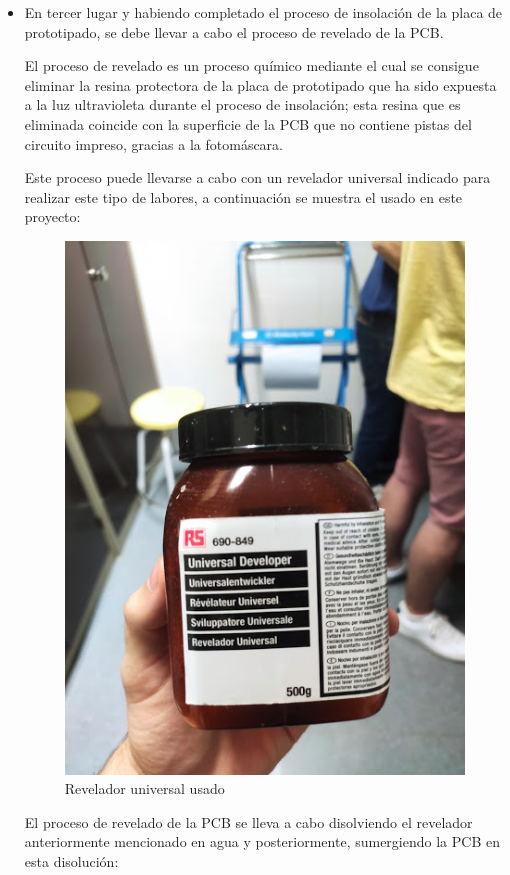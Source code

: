 \begin{itemize}
    \item En tercer lugar y habiendo completado el proceso de insolación de la placa de prototipado, se debe llevar a cabo el proceso de revelado de la \ac{PCB}.
    
    El proceso de revelado es un proceso químico mediante el cual se consigue eliminar la resina protectora de la placa de prototipado que ha sido expuesta a la luz ultravioleta durante el proceso de insolación; esta resina que es eliminada coincide con la superficie de la \ac{PCB} que no contiene pistas del circuito impreso, gracias a la fotomáscara.
    
    Este proceso puede llevarse a cabo con un revelador universal indicado para realizar este tipo de labores, a continuación se muestra el usado en este proyecto:
    
    \begin{figure}[H]
    \centering 
    \includegraphics[width=0.6\linewidth]{pictures/Revelador.jpg}
    \caption{Revelador universal usado}
    \label{fig:kdiagram}
    \end{figure}
    
    El proceso de revelado de la \ac{PCB} se lleva a cabo disolviendo el revelador anteriormente mencionado en agua y posteriormente, sumergiendo la \ac{PCB} en esta disolución:
    

\end{itemize}
